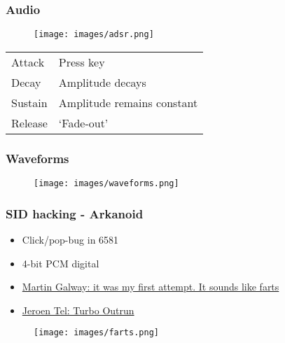 \documentclass{beamer}
\begin{document}

\begin{frame}
\frametitle{Audio}

\begin{figure}
\texttt{[image: images/adsr.png]}
\end{figure}

\begin{tabular}{l|l}
Attack & Press key \\
Decay & Amplitude decays \\
Sustain & Amplitude remains constant \\
Release & `Fade-out' \\
\end{tabular}

\end{frame}


\begin{frame}
\frametitle{Waveforms}

\begin{figure}
\texttt{[image: images/waveforms.png]}
\end{figure}

\end{frame}


\begin{frame}
\frametitle{SID hacking - Arkanoid}

\begin{itemize}
\item Click/pop-bug in 6581
\item 4-bit PCM digital
\item \href{https://www.youtube.com/watch?v=z8kyhQC5XL8}{Martin Galway: it was my first attempt. It sounds like farts}
\item \href{https://www.youtube.com/watch?v=OfYsDQqzhk8}{Jeroen Tel: Turbo Outrun}
\end{itemize}

\begin{figure}
\texttt{[image: images/farts.png]}
\end{figure}

\end{frame}

\end{document}
